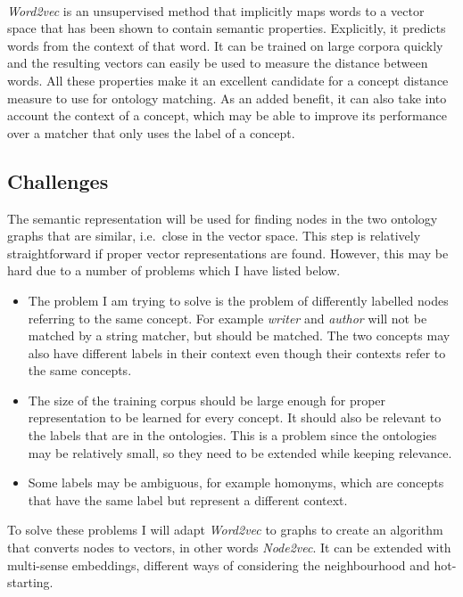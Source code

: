 \documentclass{article}
\begin{document}
 \paragraph{}
 \emph{Word2vec} is an unsupervised method that implicitly maps words to a vector space that has been shown to contain semantic properties. Explicitly, it predicts words from the context of that word. %
 It can be trained on large corpora quickly and the resulting vectors can easily be used to measure the distance between words. All these properties make it an excellent candidate for a concept distance measure to use for ontology matching. As an added benefit, it can also take into account the context of a concept, which may be able to improve its performance over a matcher that only uses the label of a concept. 
 
 \subsection{Challenges}
 The semantic representation will be used for finding nodes in the two ontology graphs that are similar, i.e.\ close in the vector space. This step is relatively straightforward if proper vector representations are found. However, this may be hard due to a number of problems which I have listed below.

 \begin{itemize}
  \item The problem I am trying to solve is the problem of differently labelled nodes referring to the same concept. For example \emph{writer} and \emph{author} will not be matched by a string matcher, but should be matched. The two concepts may also have different labels in their context even though their contexts refer to the same concepts.
  \item The size of the training corpus should be large enough for proper representation to be learned for every concept. It should also be relevant to the labels that are in the ontologies. This is a problem since the ontologies may be relatively small, so they need to be extended while keeping relevance.
  \item Some labels may be ambiguous, for example homonyms, which are concepts that have the same label but represent a different context.
 \end{itemize}
 
 To solve these problems I will adapt \emph{Word2vec} to graphs to create an algorithm that converts nodes to vectors, in other words \emph{Node2vec}. It can be extended with multi-sense embeddings, different ways of considering the neighbourhood and hot-starting.
 
\end{document}
